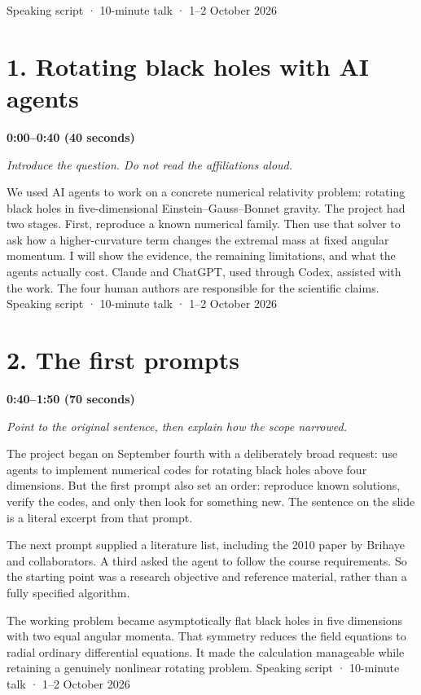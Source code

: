 \documentclass[12pt,a4paper]{article}
\begin{document}
{\small Speaking script · 10-minute talk · 1--2 October 2026}\par
\section*{1. Rotating black holes with AI agents}
\textbf{0:00--0:40 (40 seconds)}\par
{\itshape Introduce the question. Do not read the affiliations aloud.}\par\medskip
We used AI agents to work on a concrete numerical relativity problem: rotating black holes in five-dimensional Einstein--Gauss--Bonnet gravity. The project had two stages. First, reproduce a known numerical family. Then use that solver to ask how a higher-curvature term changes the extremal mass at fixed angular momentum. I will show the evidence, the remaining limitations, and what the agents actually cost. Claude and ChatGPT, used through Codex, assisted with the work. The four human authors are responsible for the scientific claims.
\newpage
{\small Speaking script · 10-minute talk · 1--2 October 2026}\par
\section*{2. The first prompts}
\textbf{0:40--1:50 (70 seconds)}\par
{\itshape Point to the original sentence, then explain how the scope narrowed.}\par\medskip
The project began on September fourth with a deliberately broad request: use agents to implement numerical codes for rotating black holes above four dimensions. But the first prompt also set an order: reproduce known solutions, verify the codes, and only then look for something new. The sentence on the slide is a literal excerpt from that prompt.

The next prompt supplied a literature list, including the 2010 paper by Brihaye and collaborators. A third asked the agent to follow the course requirements. So the starting point was a research objective and reference material, rather than a fully specified algorithm.

The working problem became asymptotically flat black holes in five dimensions with two equal angular momenta. That symmetry reduces the field equations to radial ordinary differential equations. It made the calculation manageable while retaining a genuinely nonlinear rotating problem.
\newpage
{\small Speaking script · 10-minute talk · 1--2 October 2026}\par
\end{document}
